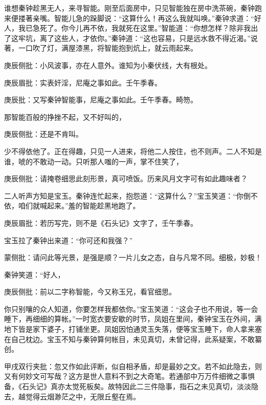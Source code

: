 \begin{parag}
    谁想秦钟趁黑无人，来寻智能。刚至后面房中，只见智能独在房中洗茶碗，秦钟跑来便搂著亲嘴。智能儿急的跺脚说：“这算什么！再这么我就叫唤。”秦钟求道：“好人，我已急死了。你今儿再不依，我就死在这里。”智能道：“你想怎样？除非我出了这牢坑，离了这些人，才依你。”秦钟道：“这也容易，只是远水救不得近渴。”说著，一口吹了灯，满屋漆黑，将智能抱到炕上，就云雨起来。\begin{note}庚辰侧批：小风波事，亦在人意外。谁知为小秦伏线，大有根处。\end{note}\begin{note}庚辰眉批：实表奸淫，尼庵之事如此。壬午季春。\end{note}\begin{note}庚辰批：又写秦钟智能事，尼庵之事如此。壬午季春。畸笏。\end{note}那智能百般的挣挫不起，又不好叫的，\begin{note}庚辰侧批：还是不肯叫。\end{note}少不得依他了。正在得趣，只见一人进来，将他二人按住，也不则声。二人不知是谁，唬的不敢动一动。只听那人嗤的一声，掌不住笑了，\begin{note}庚辰侧批：请掩卷细思此刻形景，真可喷饭。历来风月文字可有如此趣味者？\end{note}二人听声方知是宝玉。秦钟连忙起来，抱怨道：“这算什么？”宝玉笑道：“你倒不依，咱们就喊起来。”羞的智能趁黑地跑了。\begin{note}庚辰眉批：若历写完，则不是《石头记》文字了，壬午季春。\end{note}宝玉拉了秦钟出来道：“你可还和我强？”\begin{note}蒙侧批：请问此等光景，是强是顺？一片儿女之态，自与凡常不同。细极，妙极！\end{note}秦钟笑道：“好人，\begin{note}庚辰侧批：前以二字称智能，今又称玉兄，看官细思。\end{note}你只别嚷的众人知道，你要怎样我都依你。”宝玉笑道：“这会子也不用说，等一会睡下，再细细的算帐。”一时宽衣要安歇的时节，凤姐在里间，秦钟宝玉在外间，满地下皆是家下婆子，打铺坐更。凤姐因怕通灵玉失落，便等宝玉睡下，命人拿来塞在自己枕边。宝玉不知与秦钟算何帐目，未见真切，未曾记得，此系疑案，不敢纂创。\begin{note}甲戌双行夹批：忽又作如此评断，似自相矛盾，却是最妙之文。若不如此隐去，则又有何妙文可写哉？这方是世人意料不到之大奇笔。若通部中万万件细微之事惧备，《石头记》真亦太觉死板矣。故特因此二三件隐事，指石之未见真切，淡淡隐去，越觉得云烟渺茫之中，无限丘壑在焉。\end{note}
\end{parag}


